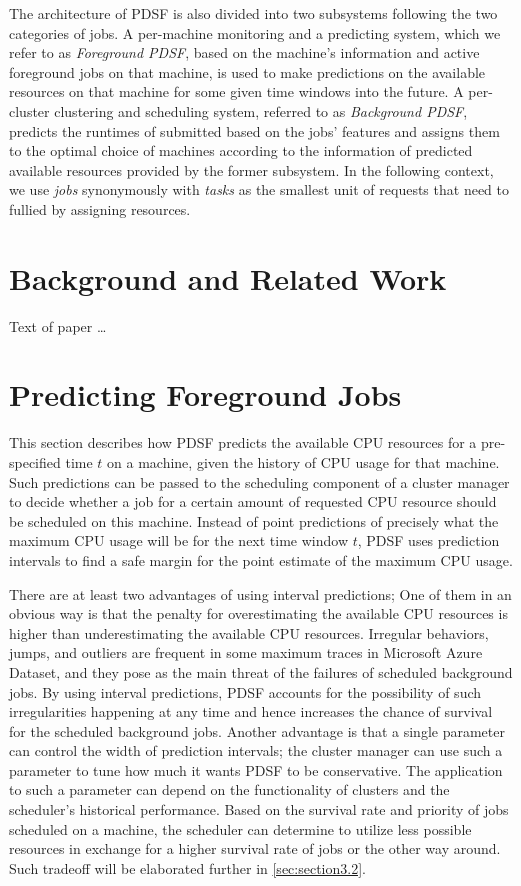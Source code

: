 \documentclass[sigplan,10pt,review,anonymous]{acmart}
\begin{document}
The architecture of PDSF is also divided into two subsystems following
the two categories of jobs. A per-machine monitoring and a predicting system, which we refer to as \textit{Foreground PDSF},
based on the machine's information and active foreground jobs on that machine,
is used to make predictions on the available resources on that machine for some
given time windows into the future. A per-cluster clustering and scheduling
system, referred to as \textit{Background PDSF}, predicts the runtimes of submitted based on the jobs' features and assigns them to the optimal choice of machines according to the information of predicted available resources provided by the former subsystem. In the following
context, we use \textit{jobs} synonymously with \textit{tasks} as the smallest
unit of requests that need to fullied by assigning resources. 
\section{Background and Related Work}

Text of paper \ldots

\section{Predicting Foreground Jobs}
\label{sec:section3}

This section describes how PDSF predicts the available CPU resources for
a pre-specified time $t$ on a machine, given the history of CPU usage for that
machine. Such predictions can be passed to the scheduling component of a cluster
manager to decide whether a job for a certain amount of requested CPU resource
should be scheduled on this machine. Instead of point predictions of precisely
what the maximum CPU usage will be for the next time window $t$, PDSF
uses prediction intervals to find a safe margin for the point estimate of the
maximum CPU usage. 

There are at least two advantages of using interval predictions; One of them in
an obvious way is that the penalty for overestimating the available CPU
resources is higher than underestimating the available CPU resources. Irregular
behaviors, jumps, and outliers are frequent in some maximum traces in Microsoft
Azure Dataset, and they pose as the main threat of the failures of scheduled
background jobs. By using interval predictions, PDSF accounts for the
possibility of such irregularities happening at any time and hence increases the
chance of survival for the scheduled background jobs. Another advantage is that
a single parameter can control the width of prediction intervals; the cluster
manager can use such a parameter to tune how much it wants PDSF to be
conservative. The application to such a parameter can depend on the
functionality of clusters and the scheduler's historical performance. Based on
the survival rate and priority of jobs scheduled on a machine, the scheduler can
determine to utilize less possible resources in exchange for a higher survival
rate of jobs or the other way around. Such tradeoff will be elaborated further
in \cref{sec:section3.2}. 
\end{document}
